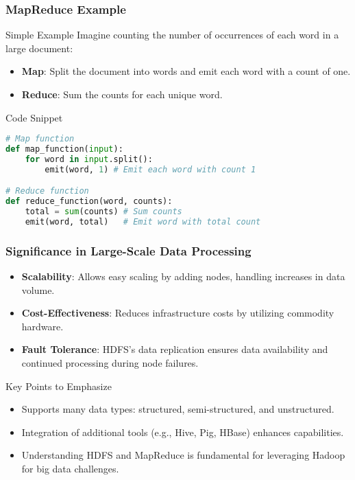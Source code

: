\documentclass[aspectratio=169]{beamer}
\begin{document}
\begin{frame}[fragile]
    \frametitle{MapReduce Example}
    \begin{block}{Simple Example}
        Imagine counting the number of occurrences of each word in a large document:
        \begin{itemize}
            \item \textbf{Map}: Split the document into words and emit each word with a count of one.
            \item \textbf{Reduce}: Sum the counts for each unique word.
        \end{itemize}
    \end{block}

    \begin{block}{Code Snippet}
    \begin{lstlisting}[language=Python]
# Map function
def map_function(input):
    for word in input.split():
        emit(word, 1) # Emit each word with count 1

# Reduce function
def reduce_function(word, counts):
    total = sum(counts) # Sum counts
    emit(word, total)   # Emit word with total count
    \end{lstlisting}
    \end{block}
\end{frame}

\begin{frame}[fragile]
    \frametitle{Significance in Large-Scale Data Processing}
    \begin{itemize}
        \item \textbf{Scalability}: Allows easy scaling by adding nodes, handling increases in data volume.
        \item \textbf{Cost-Effectiveness}: Reduces infrastructure costs by utilizing commodity hardware.
        \item \textbf{Fault Tolerance}: HDFS's data replication ensures data availability and continued processing during node failures.
    \end{itemize}

    \begin{block}{Key Points to Emphasize}
        \begin{itemize}
            \item Supports many data types: structured, semi-structured, and unstructured.
            \item Integration of additional tools (e.g., Hive, Pig, HBase) enhances capabilities.
            \item Understanding HDFS and MapReduce is fundamental for leveraging Hadoop for big data challenges.
        \end{itemize}
    \end{block}
\end{frame}
\end{document}
